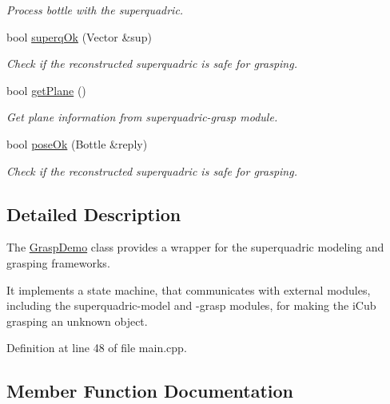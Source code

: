 \begin{DoxyCompactItemize}
\begin{DoxyCompactList}\small\item\em Process bottle with the superquadric. \end{DoxyCompactList}\item 
bool \hyperlink{classGraspDemo_a5efe5f7b89a576b4f1e846cb7bd4bdaa}{superq\+Ok} (Vector \&sup)\label{classGraspDemo_a5efe5f7b89a576b4f1e846cb7bd4bdaa}

\begin{DoxyCompactList}\small\item\em Check if the reconstructed superquadric is safe for grasping. \end{DoxyCompactList}\item 
bool \hyperlink{classGraspDemo_ae500c0a1bba0ca6898b5183450ea6bf8}{get\+Plane} ()\label{classGraspDemo_ae500c0a1bba0ca6898b5183450ea6bf8}

\begin{DoxyCompactList}\small\item\em Get plane information from superquadric-\/grasp module. \end{DoxyCompactList}\item 
bool \hyperlink{classGraspDemo_aa2513f4568fc185fa5b00d3fc6b15cdc}{pose\+Ok} (Bottle \&reply)\label{classGraspDemo_aa2513f4568fc185fa5b00d3fc6b15cdc}

\begin{DoxyCompactList}\small\item\em Check if the reconstructed superquadric is safe for grasping. \end{DoxyCompactList}\end{DoxyCompactItemize}


\subsection{Detailed Description}
The \hyperlink{classGraspDemo}{Grasp\+Demo} class provides a wrapper for the superquadric modeling and grasping frameworks. 

It implements a state machine, that communicates with external modules, including the superquadric-\/model and -\/grasp modules, for making the i\+Cub grasping an unknown object. 

Definition at line 48 of file main.\+cpp.



\subsection{Member Function Documentation}
